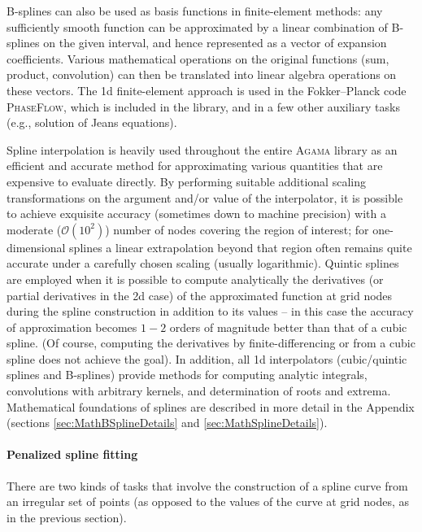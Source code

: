 \documentclass[12pt]{article}
\newcommand{\Agama}{\textsc{Agama}\xspace}
\let\oldparagraph\paragraph
\renewcommand{\paragraph}[1]{\vspace{-2mm}\oldparagraph{#1}}
\begin{document}
B-splines can also be used as basis functions in finite-element methods: any sufficiently smooth function can be approximated by a linear combination of B-splines on the given interval, and hence represented as a vector of expansion coefficients. Various mathematical operations on the original functions (sum, product, convolution) can then be translated into linear algebra operations on these vectors. The 1d finite-element approach is used in the Fokker--Planck code \textsc{PhaseFlow}, which is included in the library, and in a few other auxiliary tasks (e.g., solution of Jeans equations).

Spline interpolation is heavily used throughout the entire \Agama library as an efficient and accurate method for approximating various quantities that are expensive to evaluate directly. By performing suitable additional scaling transformations on the argument and/or value of the interpolator, it is possible to achieve exquisite accuracy (sometimes down to machine precision) with a moderate ($\mathcal O(10^2)$) number of nodes covering the region of interest; for one-dimensional splines a linear extrapolation beyond that region often remains quite accurate under a carefully chosen scaling (usually logarithmic). Quintic splines are employed when it is possible to compute analytically the derivatives (or partial derivatives in the 2d case) of the approximated function at grid nodes during the spline construction in addition to its values -- in this case the accuracy of approximation becomes $1-2$ orders of magnitude better than that of a cubic spline. (Of course, computing the derivatives by finite-differencing or from a cubic spline does not achieve the goal). In addition, all 1d interpolators (cubic/quintic splines and B-splines) provide methods for computing analytic integrals, convolutions with arbitrary kernels, and determination of roots and extrema.
Mathematical foundations of splines are described in more detail in the Appendix (sections \ref{sec:MathBSplineDetails} and \ref{sec:MathSplineDetails}).

\paragraph{Penalized spline fitting}  \label{sec:SplineFitting}
There are two kinds of tasks that involve the construction of a spline curve from an irregular set of points (as opposed to the values of the curve at grid nodes, as in the previous section).
\end{document}
